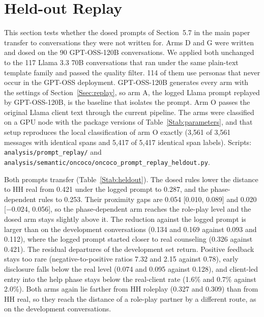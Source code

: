 \documentclass[fleqn,10pt]{JLA_article}
\newcommand{\fitwidth}[1]{\resizebox{\ifdim\width>\linewidth \linewidth\else \width\fi}{!}{#1}}
\begin{document}
\section{Held-out Replay}
\label{Ssec:heldout}
This section tests whether the dosed prompts of Section~5.7 in the main paper transfer to conversations they were not written for. Arms D and G were written and dosed on the 90 GPT-OSS-120B conversations. We applied both unchanged to the 117 Llama 3.3 70B conversations that ran under the same plain-text template family and passed the quality filter. 114 of them use personas that never occur in the GPT-OSS deployment. GPT-OSS-120B generates every arm with the settings of Section~\ref{Ssec:replay}, so arm A, the logged Llama prompt replayed by GPT-OSS-120B, is the baseline that isolates the prompt. Arm O passes the original Llama client text through the current pipeline. The arms were classified on a GPU node with the package versions of Table~\ref{Stab:parameters}, and that setup reproduces the local classification of arm O exactly (3{,}561 of 3{,}561 messages with identical spans and 5{,}417 of 5{,}417 identical span labels). Scripts: \texttt{analysis/prompt\_replay/} and \texttt{analysis/semantic/oncoco/oncoco\_prompt\_replay\_heldout.py}.

Both prompts transfer (Table~\ref{Stab:heldout}). The dosed rules lower the distance to HH real from 0.421 under the logged prompt to 0.287, and the phase-dependent rules to 0.253. Their proximity gaps are 0.054 [0.010, 0.089] and 0.020 [$-$0.024, 0.056], so the phase-dependent arm reaches the role-play level and the dosed arm stays slightly above it. The reduction against the logged prompt is larger than on the development conversations (0.134 and 0.169 against 0.093 and 0.112), where the logged prompt started closer to real counseling (0.326 against 0.421). The residual departures of the development set return. Positive feedback stays too rare (negative-to-positive ratios 7.32 and 2.15 against 0.78), early disclosure falls below the real level (0.074 and 0.095 against 0.128), and client-led entry into the help phase stays below the real-client rate (1.6\% and 0.7\% against 2.0\%). Both arms again lie farther from HH roleplay (0.327 and 0.309) than from HH real, so they reach the distance of a role-play partner by a different route, as on the development conversations.

\begin{table}[t]
\caption{Held-out prompt replay on the 117 Llama 3.3 70B conversations of the plain-text template family, client side. Arms A, D, and G are generated by GPT-OSS-120B on the original histories, and arm O is the original Llama text through the current pipeline. Columns as in Table~4 of the main paper, plus the JSD to HH roleplay. Intervals are conversation-level bootstraps with 20{,}000 resamples.}
\label{Stab:heldout}
\centering
\footnotesize
\setlength{\tabcolsep}{4pt}
\fitwidth{}
\end{table}
\end{document}
